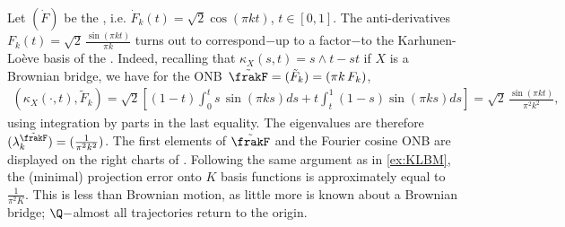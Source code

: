 \begin{example}\label{ex:cosine}
Let $(\dot{F})$ be the , i.e.
$\dot{F}_k(t) = \sqrt{2}\cos(\pi k t)$, $t \in [0,1]$. The anti-derivatives $F_k(t) = \sqrt{2}\,\frac{\sin(\pi k t)}{\pi k}$ turns out to correspond$-$up to a factor$-$to the Karhunen-Lo\`eve basis of the . Indeed, recalling that $\kappa_X(s,t) = s\wedge t - st$ if $X$ is a Brownian bridge, we have for the ONB $\, \tilde{\frakF} = (\tilde{F}_k) = (\pi k \, F_k)$, 
\begin{align*}
    (\kappa_X(\cdot,t),\tilde{F}_k) 
    = \sqrt{2}\left[(1-t)\int_0^t s\, \sin(\pi k s) ds + t \int_t^1 (1-s)\sin(\pi k s) ds\right]
    = \sqrt{2}\, \frac{\sin(\pi k t)}{\pi^2 k^2},
\end{align*}
using integration by parts in the last equality. 
The eigenvalues  are therefore $(\lambda_k^{\tilde{\frakF}}) = (\frac{1}{\pi^2 k^2})$. 
The first elements of $\tilde{\frakF}$ and the Fourier cosine ONB are displayed on the right charts of  .
Following the same argument as in  \cref{ex:KLBM}, the (minimal) projection error onto $K$ basis functions is approximately equal to $\frac{1}{\pi^2 K}$. This is less than Brownian motion, as little more is known about a Brownian bridge; $\Q-$almost all trajectories return to the origin.

\end{example}

 
 
 
 
 
 